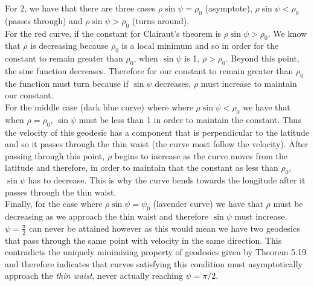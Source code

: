 \documentclass[a4paper, 11pt]{article}
\begin{document}
	\noindent For 2, we have that there are three cases $\rho\sin\psi = \rho_0$ (asymptote),  $\rho\sin\psi < \rho_0$ (passes through) and  $\rho\sin\psi > \rho_0$ (turns around). \\
	
	\noindent For the red curve, if the constant for Clairaut's theorem is $\rho\sin\psi> \rho_0$. We know that $\rho$ is decreasing because $\rho_0$ is a local minimum and so in order for the constant to remain greater than $\rho_0$, when $\sin\psi$ is 1,  $\rho > \rho_0$. Beyond this point, the sine function decreases. Therefore for our constant to remain greater than $\rho_0$ the function must turn because if $\sin\psi$ decreases, $\rho$ must increase to maintain our constant.  \\
	
	
	\noindent For the middle case (dark blue curve) where where $\rho\sin\psi < \rho_0$ we have that when $\rho = \rho_0$, $\sin\psi$ must be less than 1 in order to maintain the constant. Thus the velocity of this geodesic has a component that is perpendicular to the latitude and so it passes through the thin waist (the curve most follow the velocity). After passing through this point, $\rho$ begins to increase as the curve moves from the latitude and therefore, in order to maintain that the constant as less than $\rho_0$, $\sin\psi$ has to decrease. This is why the curve bends towards the longitude after it passes through the thin waist. \\
	
	\noindent Finally, for the case where $\rho\sin\psi = \psi_0$ (lavender curve) we have that $\rho$ must be decreasing as we approach the thin waist and therefore $\sin\psi$ must increase. $\psi=\frac{\pi}{2}$ can never be attained however as this would mean we have two geodesics that pass through the same point with velocity in the same direction. This contradicts the uniquely minimizing property of geodesics given by Theorem 5.19 and therefore indicates that curves satisfying this condition must asymptotically approach the \textit{thin waist}, never actually reaching $\psi = \pi/2$.  
	
\end{document}
